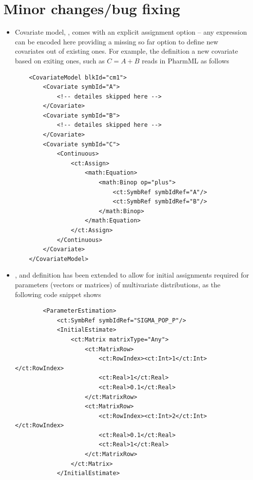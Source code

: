\section{Minor changes/bug fixing}
\label{sec:minorChanges}

\begin{itemize}
\item 
Covariate model, , comes with an explicit assignment option -- any expression 
can be encoded here providing a missing so far option to define new covariates
out of existing ones. For example, the definition a new covariate based on exiting ones, 
such as $C=A+B$ reads in PharmML as follows 
\lstset{language=XML}
\begin{lstlisting}
    <CovariateModel blkId="cm1">
        <Covariate symbId="A">
            <!-- detailes skipped here -->
        </Covariate>
        <Covariate symbId="B">
            <!-- detailes skipped here -->
        </Covariate>
        <Covariate symbId="C">
            <Continuous>
                <ct:Assign>
                    <math:Equation>
                        <math:Binop op="plus">
                            <ct:SymbRef symbIdRef="A"/>
                            <ct:SymbRef symbIdRef="B"/>
                        </math:Binop>
                    </math:Equation>
                </ct:Assign>
            </Continuous>
        </Covariate>
    </CovariateModel>
\end{lstlisting}
\item 
{},  and  definition
has been extended to allow for initial assignments required for parameters 
(vectors or matrices) of multivariate distributions, as the following code snippet 
shows
\lstset{language=XML}
\begin{lstlisting}
        <ParameterEstimation>
            <ct:SymbRef symbIdRef="SIGMA_POP_P"/>
            <InitialEstimate>
                <ct:Matrix matrixType="Any">
                    <ct:MatrixRow>
                        <ct:RowIndex><ct:Int>1</ct:Int></ct:RowIndex>
                        <ct:Real>1</ct:Real>
                        <ct:Real>0.1</ct:Real>
                    </ct:MatrixRow>
                    <ct:MatrixRow>
                        <ct:RowIndex><ct:Int>2</ct:Int></ct:RowIndex>
                        <ct:Real>0.1</ct:Real>
                        <ct:Real>1</ct:Real>
                    </ct:MatrixRow>
                </ct:Matrix>
            </InitialEstimate>

\end{lstlisting}
\end{itemize}
